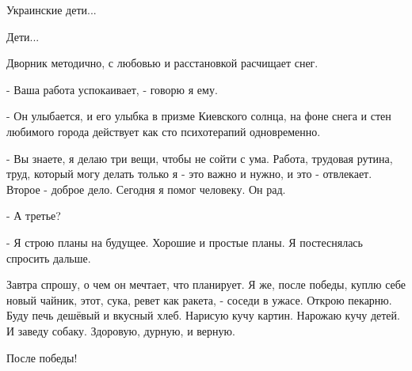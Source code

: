 Украинские дети... 

Дети...

Дворник методично, с любовью и расстановкой расчищает снег. 

- Ваша работа успокаивает, - говорю я ему. 

- Он улыбается, и его улыбка в призме Киевского солнца, на фоне снега и стен
любимого города действует как сто психотерапий одновременно. 

- Вы знаете, я делаю три вещи, чтобы не сойти с ума. Работа, трудовая рутина,
труд, который могу делать только я - это важно и нужно, и это - отвлекает.
Второе - доброе дело. Сегодня я помог человеку. Он рад. 

- А третье? 

- Я строю планы на будущее. Хорошие и простые планы. Я постеснялась спросить
дальше. 

Завтра спрошу, о чем он мечтает, что планирует. Я же, после победы, куплю себе
новый чайник, этот, сука, ревет как ракета, - соседи в ужасе. Открою пекарню.
Буду печь дешёвый и вкусный хлеб. Нарисую кучу картин. Нарожаю кучу детей. И
заведу собаку. Здоровую, дурную, и верную.

После победы!
